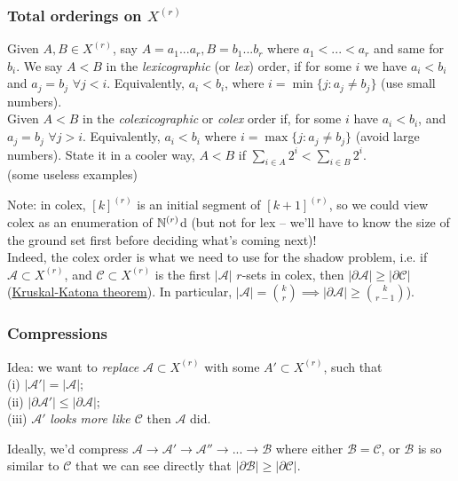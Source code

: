 \documentclass[a4paper]{article}
\begin{document}
\subsubsection{Total orderings on $X^{(r)}$}
\begin{defi}
Given $A,B \in X^{(r)}$, say $A = a_1...a_r,B=b_1...b_r$ where $a_1<...<a_r$ and same for $b_i$. We say $A<B$ in the \emph{lexicographic} (or \emph{lex}) order, if for some $i$ we have $a_i < b_i$ and $a_j = b_j$ $\forall j < i$. Equivalently, $a_i<b_i$, where $i=\min\{j: a_j \neq b_j\}$ (use small numbers).\\
Given $A<B$ in the \emph{colexicographic} or \emph{colex} order if, for some $i$ have $a_i<b_i$, and $a_j=b_j$ $\forall j>i$. Equivalently, $a_i < b_i$ where $i = \max\{j:a_j \neq b_j\}$ (avoid large numbers). State it in a cooler way, $A<B$ if $\sum_{i \in A} 2^i < \sum_{i \in B} 2^i$.\\
(some useless examples)
\end{defi}

Note: in colex, $[k]^{(r)}$ is an initial segment of $[k+1]^{(r)}$, so we could view colex as an enumeration of $\mathbb{N}^{(r)}$d (but not for lex -- we'll have to know the size of the ground set first before deciding what's coming next)!\\
Indeed, the colex order is what we need to use for the shadow problem, i.e. if $\mathcal{A} \subset X^{(r)}$, and $\mathcal{C} \subset X^{(r)}$ is the first $|\mathcal{A}|$ $r$-sets in colex, then $|\partial \mathcal{A}| \geq |\partial \mathcal{C}|$ (\href{https://en.wikipedia.org/wiki/Kruskal%E2%80%93Katona_theorem}{Kruskal-Katona theorem}). In particular, $|\mathcal{A}| = {k \choose r} \implies |\partial \mathcal{A}| \geq {k \choose {r-1}}$).

\subsubsection{Compressions}
Idea: we want to \emph{replace} $\mathcal{A} \subset X^{(r)}$ with some $A' \subset X^{(r)}$, such that\\
(i) $|\mathcal{A}'| = |\mathcal{A}|$;\\
(ii) $|\partial \mathcal{A}'| \leq |\partial \mathcal{A}|$;\\
(iii) $\mathcal{A}'$ \emph{looks more like $\mathcal{C}$} then $\mathcal{A}$ did.

Ideally, we'd compress $\mathcal{A} \to \mathcal{A}' \to \mathcal{A}'' \to ... \to \mathcal{B}$ where either $\mathcal{B} = \mathcal{C}$, or $\mathcal{B}$ is so similar to $\mathcal{C}$ that we can see directly that $|\partial \mathcal{B}| \geq |\partial \mathcal{C}|$.
\end{document}
